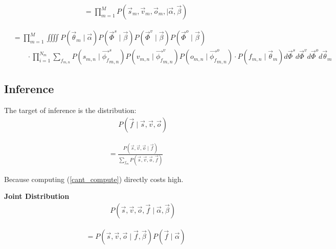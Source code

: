 \documentclass{article}
\begin{document}
\begin{equation}
\begin{aligned}
&= \prod_{m=1}^{M} P(\vec{s}_m, \vec{v}_m, \vec{o}_m, \mid \vec{\alpha}, \vec{\beta})
\end{aligned}
\end{equation}


\begin{equation}
\begin{aligned}
&= \prod_{m=1}^{M} \iiiint  
P(\vec{\theta}_m \mid \vec{\alpha})
P(\vec{\Phi}^s \mid \vec{\beta})
P(\vec{\Phi}^v \mid \vec{\beta})
P(\vec{\Phi}^o \mid \vec{\beta}) \\
&\qquad\cdot  \prod_{i=1}^{N_m} 
\sum_{f_{m,n}}
P(s_{m,n} \mid \vec{\phi_{f}}_{m,n}^s)
P(v_{m,n} \mid \vec{\phi_{f}}_{m,n}^v)
P(o_{m,n} \mid \vec{\phi_{f}}_{m,n}^o) 
\cdot 
P(f_{m,n} \mid \vec{\theta}_m)
d\vec{\Phi}^s
d\vec{\Phi}^v
d\vec{\Phi}^o
d\vec{\theta}_m 
\end{aligned}
\end{equation}




\subsection{Inference}
The target of inference is the distribution:
\begin{equation}
\begin{aligned}
& \qquad P(\vec{f} \mid \vec{s}, \vec{v}, \vec{o})
\end{aligned}
\end{equation}

\begin{equation}
\begin{aligned} \label{cant_compute}
&= \frac{P( \vec{s}, \vec{v}, \vec{o} \mid \vec{f} )} {\sum_{f_m} P(\vec{s}, \vec{v}, \vec{o}, \vec{f})}
\end{aligned}
\end{equation}

\noindent Because computing (\ref{cant_compute}) directly costs high.  

 \textbf{Joint Distribution}
\begin{equation}
\begin{aligned}
& \qquad P(\vec{s}, \vec{v}, \vec{o}, \vec{f} \mid \vec{\alpha}, \vec{\beta})
\end{aligned}
\end{equation}

\begin{equation}
\begin{aligned}
&= P(\vec{s}, \vec{v}, \vec{o} \mid \vec{f}, \vec{\beta}) P(\vec{f} \mid \vec{\alpha})
\end{aligned}
\end{equation}
\end{document}

